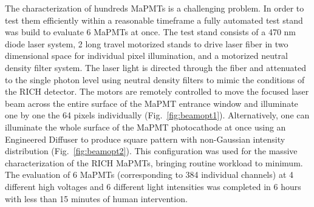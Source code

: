 \documentclass[5p,times,twocolumn]{elsarticle}
\begin{document}
The characterization of hundreds MaPMTs is a  challenging problem. 
In order to test them efficiently within a reasonable timeframe a fully automated test stand was build to evaluate 6 MaPMTs at once. 
The test stand consists of a 470 nm diode laser system, 2 long travel motorized stands to drive laser fiber in two dimensional space for individual pixel illumination, and a motorized neutral density filter system.
The laser light is directed through the fiber and attenuated to the single photon level using neutral density filters to mimic the conditions of the RICH detector.
The motors are remotely controlled to move the focused laser beam across the entire surface of the MaPMT entrance window and illuminate one by one the 64 pixels individually (Fig.~\ref{fig:beamopt1}).
Alternatively, one can illuminate the whole surface of the MaPMT photocathode at once using an Engineered Diffuser to produce square pattern with non-Gaussian intensity distribution (Fig.~\ref{fig:beamopt2}).  
This configuration was used for the massive characterization of the RICH MaPMTs, bringing routine workload to minimum.
The evaluation of 6 MaPMTs (corresponding to 384 individual channels) at 4 different high voltages and 6 different light intensities was completed in 6 hours with less than 15 minutes of human intervention.
\end{document}
